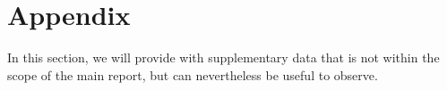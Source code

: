 \documentclass[a4paper]{report}
\numberwithin{equation}{section}
\begin{document}
\chapter{Appendix}

In this section, we will provide with supplementary data that is not within the scope of the main report, but can nevertheless
be useful to observe. 

\begin{figure}[htb!]
	\centering
	\quad
	\quad
	\quad

\end{figure}
\end{document}
